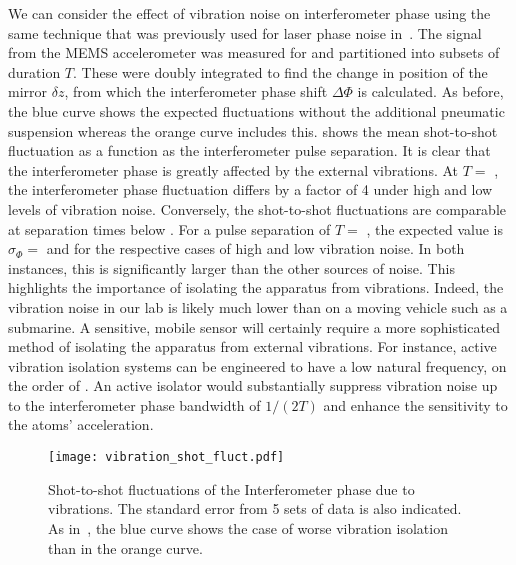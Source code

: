 \par\noindent
We can consider the effect of vibration noise on interferometer phase
using the same technique that was previously used for laser phase noise
in~. The signal from the MEMS
accelerometer was measured for  and partitioned
into subsets of duration $T$. These were doubly integrated to find the
change in position of the mirror $\delta z$, from which the
interferometer phase shift $\Delta \Phi$ is calculated. As before, the
blue curve shows the expected fluctuations without the additional
pneumatic suspension whereas the orange curve includes this. 
 shows the mean shot-to-shot
fluctuation as a function as the interferometer pulse separation. It
is clear that the interferometer phase is greatly affected by the
external vibrations. At $T = $ , the
interferometer phase fluctuation differs by a factor of 4 under high and low levels of
vibration noise. Conversely, the shot-to-shot fluctuations
are comparable at separation times below . 
For a pulse separation of \(T =\) , the expected value is $\sigma_\Phi =$
 and  for the
respective cases of high and low vibration noise. In both instances,
this is significantly larger than the other sources of noise. This
highlights the importance of isolating the apparatus from vibrations.
Indeed, the vibration noise in our lab is likely much lower than on a
moving vehicle such as a submarine. 
A sensitive, mobile sensor will certainly require a more sophisticated
method of isolating the apparatus from external vibrations. For
instance, active
vibration isolation systems can be engineered to have a low natural
frequency, on the order of
\cite{Zhou2012}. An active isolator would
substantially suppress vibration noise up to the interferometer phase
bandwidth of $1/(2T)$ and enhance the sensitivity to the atoms'
acceleration.
\begin{figure}[htpb]
  \centering
  \texttt{[image: vibration\_shot\_fluct.pdf]}
  \caption{Shot-to-shot fluctuations of the Interferometer phase due
  to vibrations. The standard error from 5 sets of data is also
indicated. As in~, the blue curve
shows the case of worse vibration isolation than in the orange curve.}
  \label{fig:vibration_shot_fluct}
\end{figure}
